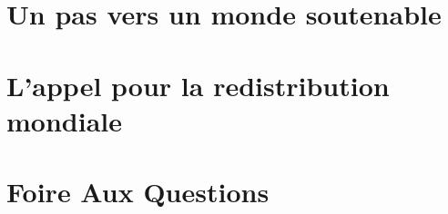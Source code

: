 \documentclass[a5paper,french]{memoir}
\begin{document}
\chapter{Un pas vers un monde soutenable\label{ch:premier_pas}}

\chapter{L'appel pour la redistribution mondiale\label{ch:appel}}

\chapter{Foire Aux Questions\label{ch:faq}}


\end{document}
